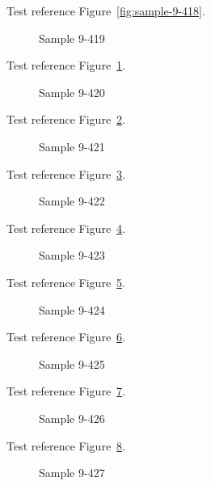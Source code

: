 Test reference Figure~\ref{fig:sample-9-418}.

\begin{figure}[tbhp]
\caption{Sample 9-419}
\label{fig:sample-9-419}
\end{figure}

Test reference Figure~\ref{fig:sample-9-419}.

\begin{figure}[tbhp]
\caption{Sample 9-420}
\label{fig:sample-9-420}
\end{figure}

Test reference Figure~\ref{fig:sample-9-420}.

\begin{figure}[tbhp]
\caption{Sample 9-421}
\label{fig:sample-9-421}
\end{figure}

Test reference Figure~\ref{fig:sample-9-421}.

\begin{figure}[tbhp]
\caption{Sample 9-422}
\label{fig:sample-9-422}
\end{figure}

Test reference Figure~\ref{fig:sample-9-422}.

\begin{figure}[tbhp]
\caption{Sample 9-423}
\label{fig:sample-9-423}
\end{figure}

Test reference Figure~\ref{fig:sample-9-423}.

\begin{figure}[tbhp]
\caption{Sample 9-424}
\label{fig:sample-9-424}
\end{figure}

Test reference Figure~\ref{fig:sample-9-424}.

\begin{figure}[tbhp]
\caption{Sample 9-425}
\label{fig:sample-9-425}
\end{figure}

Test reference Figure~\ref{fig:sample-9-425}.

\begin{figure}[tbhp]
\caption{Sample 9-426}
\label{fig:sample-9-426}
\end{figure}

Test reference Figure~\ref{fig:sample-9-426}.

\begin{figure}[tbhp]
\caption{Sample 9-427}
\label{fig:sample-9-427}
\end{figure}


